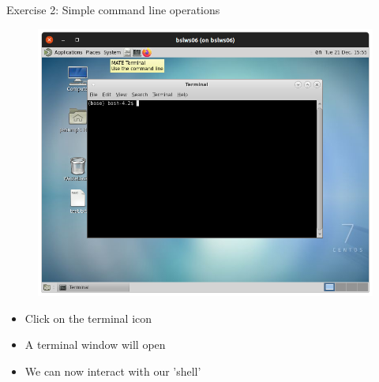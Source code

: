 \documentclass[handout]{beamer} %
\begin{document}
{\begin{frame}{Exercise 2: Simple command line operations}
\begin{minipage}{0.5\textwidth}
\begin{figure}[H]
\includegraphics[scale=0.25]{x2go-terminal}
\end{figure}
\end{minipage} \hfill
\begin{minipage}{0.35\textwidth}
\begin{itemize}
\item Click on the terminal icon 
\item A terminal window will open
\item We can now interact with our 'shell'
\end{itemize}
\end{minipage}
\end{frame}
}
\end{document}
